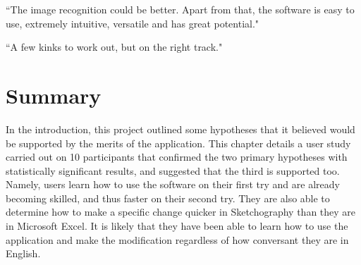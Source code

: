 ``The image recognition could be better. Apart from that, the software is easy to use, extremely intuitive, versatile and has great potential."

``A few kinks to work out, but on the right track."

\section{Summary}
In the introduction, this project outlined some hypotheses that it believed would be supported by the merits of the application. This chapter details a user study carried out on 10 participants that confirmed the two primary hypotheses with statistically significant results, and suggested that the third is supported too. Namely, users learn how to use the software on their first try and are already becoming skilled, and thus faster on their second try. They are also able to determine how to make a specific change quicker in Sketchography than they are in Microsoft Excel. It is likely that they have been able to learn how to use the application and make the modification regardless of how conversant they are in English.